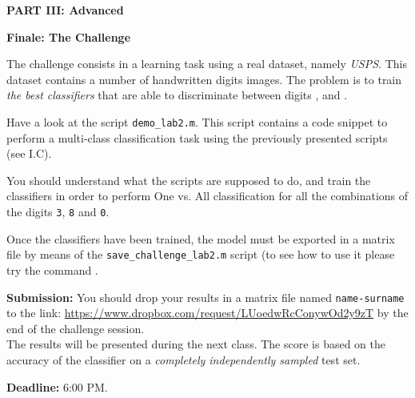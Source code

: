 \documentclass[DIN, pagenumber=false, fontsize=11pt, parskip=half]{scrartcl}
\newcommand{\mysection}[1]{\noindent\large\textbf{#1}}
\begin{document}
 
 


\begin{center}
\large\textbf{PART III: Advanced}
\end{center}

\mysection{Finale: The Challenge}

The challenge consists in a learning task using a real dataset, namely \emph{USPS}. This dataset contains a number of handwritten digits images. The problem is to train \emph{the best classifiers} that are able to discriminate between digits ,  and .

Have a look at the script \texttt{demo\_lab2.m}. This script contains a code snippet to perform a multi-class classification task using the previously presented scripts (see I.C).

You should understand what the scripts are supposed to do, and train the classifiers in order to perform One vs. All classification for all the combinations of the digits \texttt{3}, \texttt{8} and \texttt{0}.

Once the classifiers have been trained, the model must be exported in a matrix file by means of the \texttt{save\_challenge\_lab2.m} script (to see how to use it please try the command .

\begin{framed}
\textbf{Submission:}
You should drop your results in a matrix file named \texttt{name-surname} to the link: \url{https://www.dropbox.com/request/LUoedwRcConywOd2y9zT} by the end of the challenge session.\\
The results will be presented during the next class. The score is based on the accuracy of the classifier on a \textit{completely independently sampled} test set.

\textbf{Deadline:} 6:00 PM.
\end{framed}
\end{document}
